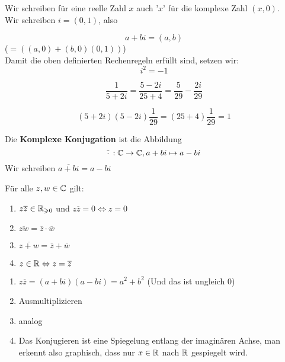 \documentclass[main.tex]{subfiles}
\begin{document}
\begin{Bemerkung}[Notation]
  Wir schreiben für eine reelle Zahl $x$ auch '$x$' für die komplexe Zahl $(x,0)$.\\
  Wir schreiben $i = (0,1)$, also
  \begin{Definition}
    $$a+bi = (a,b)$$
    ($= ((a,0)+(b,0)(0,1))$)\\
    Damit die oben definierten Rechenregeln erfüllt sind, setzen wir:
    $$i^2 = -1$$
  \end{Definition}
\end{Bemerkung}

\begin{Beispiel}
  $$\dfrac{1}{5+2i} = \dfrac{5-2i}{25+4} = \dfrac{5}{29} - \dfrac{2i}{29}$$
  \begin{Beweis}
    $$(5+2i)(5-2i)\dfrac{1}{29} = (25+4)\dfrac{1}{29} = 1$$
  \end{Beweis}
\end{Beispiel}

\begin{Definition}
  Die \textbf{Komplexe Konjugation} ist die Abbildung
  $$\overline{\cdot} \,:  \mathbb{C} \to \mathbb{C}, a+bi \mapsto a-bi$$
  Wir schreiben $\overline{a+bi} = a-bi$
\end{Definition}

\begin{Lemma}
  Für alle $z,w \in \mathbb{C}$ gilt:
  \begin{enumerate}
    \item $z \overline{z} \in \mathbb{R}_{\geqslant 0}$ und $z \overline{z} = 0 \Leftrightarrow z = 0$
    \item $\overline{zw} = \overline{z}\cdot \overline{w}$
    \item $\overline{z+w} = \overline{z}+\overline{w}$
    \item $z\in \mathbb{R} \Leftrightarrow z = \overline{z}$
  \end{enumerate}
\end{Lemma}

\begin{Beweis}
  \begin{enumerate}
    \item $z \overline{z} = (a+bi)(a-bi)=a^2+b^2$ (Und das ist ungleich 0)
    \item Ausmultiplizieren
    \item analog
    \item Das Konjugieren ist eine Spiegelung entlang der imaginären Achse, man erkennt also graphisch, dass nur $x\in \mathbb{R}$ nach $\mathbb{R}$ gespiegelt wird.
  \end{enumerate}
\end{Beweis}
\end{document}
